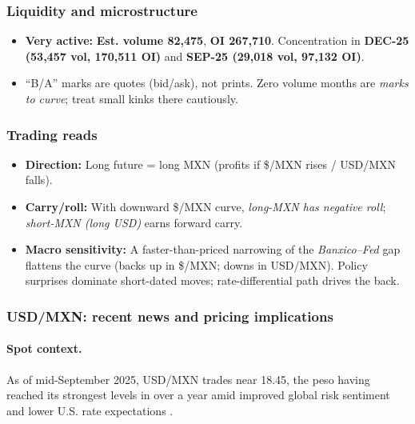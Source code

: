 \documentclass[11pt,a4paper]{article} %
\begin{document}
\subsubsection*{Liquidity and microstructure}
\begin{itemize}
  \item \textbf{Very active:} \textbf{Est. volume 82,475}, \textbf{OI 267,710}. Concentration in \textbf{DEC-25 (53,457 vol, 170,511 OI)} and \textbf{SEP-25 (29,018 vol, 97,132 OI)}.
  \item ``B/A'' marks are quotes (bid/ask), not prints. Zero volume months are \emph{marks to curve}; treat small kinks there cautiously.
\end{itemize}

\subsubsection*{Trading reads}
\begin{itemize}
  \item \textbf{Direction:} Long future = long MXN (profits if \$/MXN rises / USD/MXN falls).
  \item \textbf{Carry/roll:} With downward \$/MXN curve, \emph{long-MXN has negative roll}; \emph{short-MXN (long USD)} earns forward carry.
  \item \textbf{Macro sensitivity:} A faster-than-priced narrowing of the \emph{Banxico--Fed} gap flattens the curve (backs up in \$/MXN; downs in USD/MXN). Policy surprises dominate short-dated moves; rate-differential path drives the back.
\end{itemize}

\subsubsection{USD/MXN: recent news and pricing implications}
\paragraph{Spot context.}
As of mid-September 2025, USD/MXN trades near 18.45, the peso having reached its strongest levels in over a year amid improved global risk sentiment and lower U.S. rate expectations \citep{reuters_usdmxn_quote,reuters_mx_markets_11sep,reuters_mx_markets_12sep}.
\end{document}

